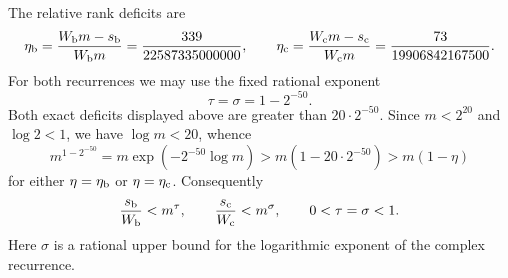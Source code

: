 The relative rank deficits are
\[
 \eta_{\rm b}=\frac{W_{\rm b}m-s_{\rm b}}{W_{\rm b}m}
       =\frac{339}{22587335000000},\qquad
 \eta_{\rm c}=\frac{W_{\rm c}m-s_{\rm c}}{W_{\rm c}m}
       =\frac{73}{19906842167500}.
\]
For both recurrences we may use the fixed rational exponent
\begin{equation}
 \tau=\sigma=1-2^{-50}.
 \label{eq:explicit-motif-exponents}
\end{equation}
Both exact deficits displayed above are greater than $20\cdot2^{-50}$.
Since $m<2^{20}$ and $\log 2<1$, we have $\log m<20$, whence
\[
 m^{1-2^{-50}}
 =m\exp(-2^{-50}\log m)
 >m(1-20\cdot2^{-50})>m(1-\eta)
\]
for either $\eta=\eta_{\rm b}$ or $\eta=\eta_{\rm c}$.
Consequently
\[
 \frac{s_{\rm b}}{W_{\rm b}}<m^\tau,
 \qquad \frac{s_{\rm c}}{W_{\rm c}}<m^\sigma,
 \qquad 0<\tau=\sigma<1.
\]
Here $\sigma$ is a rational upper bound for the logarithmic exponent
of the complex recurrence.
